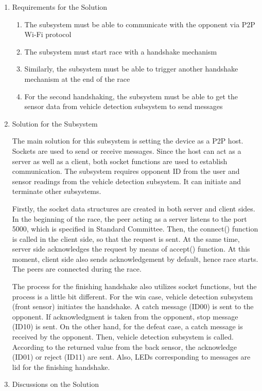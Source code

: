 \documentclass[a4paper,12pt]{article}
\begin{document}
		\begin{enumerate}
			\item {Requirements for the Solution}
			\begin{enumerate}
				\item The subsystem must be able to communicate with the opponent via P2P Wi-Fi protocol
				\item The subsystem must start race with a handshake mechanism
				\item Similarly, the subsystem must be able to trigger another handshake mechanism at the end of the race
				\item For the second handshaking, the subsystem must be able to get the sensor data from vehicle detection subsystem to send messages
			\end{enumerate}
			\item {Solution for the Subsystem}
			
		The main solution for this subsystem is setting the device as a P2P host. Sockets are used to send or receive messages.  Since the host can act as a server as well as a client, both socket functions are used to establish communication. The subsystem requires opponent ID from the user and sensor readings from the vehicle detection subsystem. It can initiate and terminate other subsystems.
		
		Firstly, the socket data structures are created in both server and client sides. In the beginning of the race, the peer acting as a server listens to the port 5000, which is specified in Standard Committee. Then, the connect() function is called in the client side, so that the request is sent. At the same time, server side acknowledges the request by means of accept() function. At this moment, client side also sends acknowledgement by default, hence race starts. The peers are connected during the race.
		
		The process for the finishing handshake also utilizes socket functions, but the process is a little bit different. For the win case, vehicle detection subsystem (front sensor) initiates the handshake. A catch message (ID00) is sent to the opponent. If acknowledgment is taken from the opponent, stop message (ID10) is sent. On the other hand, for the defeat case, a catch message is received by the opponent. Then, vehicle detection subsystem is called. According to the returned value from the back sensor, the acknowledge (ID01) or reject (ID11) are sent. Also, LEDs corresponding to messages are lid for the finishing handshake.
		
		
	
	
			
			\item {Discussions on the Solution}
			
		\end{enumerate}
	
\end{document}
